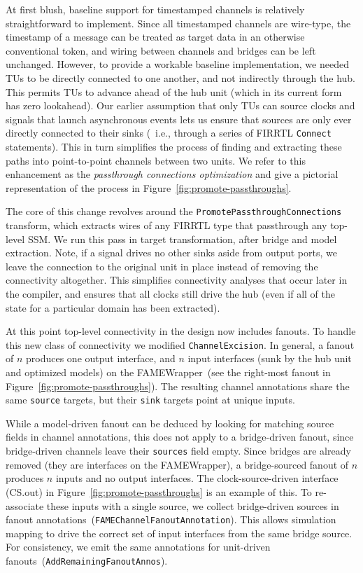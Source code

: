 At first blush, baseline support for timestamped channels is relatively
straightforward to implement. Since all timestamped channels are wire-type, the
timestamp of a message can be treated as target data in an otherwise conventional
token, and wiring between channels and bridges can be left unchanged. However,
to provide a workable baseline implementation, we needed TUs to be
directly connected to one another, and not indirectly through the hub.  This
permits TUs to advance ahead of the hub unit (which in its current form has zero lookahead).
Our earlier assumption that only TUs
can source clocks and signals that launch asynchronous events lets us ensure that sources are only
ever directly connected to their sinks (~i.e., through a series of FIRRTL
\texttt{Connect} statements). This in turn simplifies the process of finding and extracting these
paths into point-to-point channels between two units. We refer to this enhancement
as the \emph{passthrough connections optimization} and give a pictorial representation of the process in Figure~\ref{fig:promote-passthroughs}.

The core of this change revolves around the
\texttt{PromotePassthroughConnections} transform, which extracts wires of any FIRRTL type that
passthrough any top-level SSM. We run this pass in target transformation, after bridge and model extraction.
Note, if a signal drives no other sinks aside from output ports, we leave the
connection to the original unit in place instead of removing the connectivity altogether.  This
simplifies connectivity analyses that occur later in the compiler, and ensures
that all clocks still drive the hub (even if all of the state for a particular
domain has been extracted).

At this point top-level connectivity in the design now includes fanouts. To
handle this new class of connectivity we modified \texttt{ChannelExcision}. In
general, a fanout of $n$ produces one output interface, and $n$ input interfaces
(sunk by the hub unit and optimized models) on the FAMEWrapper~(see the
right-most fanout in Figure~\ref{fig:promote-passthroughs}). The resulting
channel annotations share the same \texttt{source} targets, but their \texttt{sink} targets point at unique
inputs.

While a model-driven fanout can be deduced by looking for matching source fields in
channel annotations, this does not apply to a bridge-driven fanout, since
bridge-driven channels leave their \texttt{sources} field empty.  Since
bridges are already removed (they are interfaces on the FAMEWrapper), a
bridge-sourced fanout of $n$ produces $n$ inputs and no output interfaces. The clock-source-driven interface (CS.out) in
Figure~\ref{fig:promote-passthroughs} is an example of this.
To re-associate these inputs with a single source, we collect bridge-driven
sources in fanout annotations~(\texttt{FAMEChannelFanoutAnnotation}). This
allows simulation mapping to drive the correct set of input interfaces from the
same bridge source. For consistency, we emit the same annotations for
unit-driven fanouts~(\texttt{AddRemainingFanoutAnnos}).


